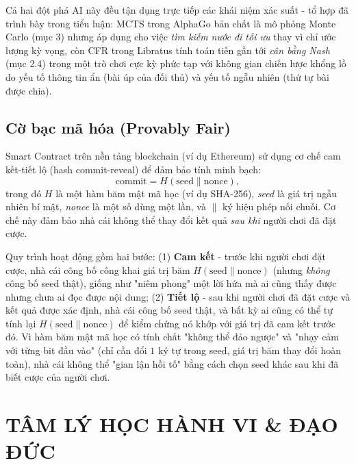\documentclass[12pt,a4paper]{article}
\theoremstyle{coloredthm}
\theoremstyle{coloreddef}
\theoremstyle{remark}
\begin{document}
\begin{giaithich}
Cả hai đột phá AI này đều tận dụng trực tiếp các khái niệm xác suất - tổ hợp đã trình bày trong tiểu luận: MCTS trong AlphaGo bản chất là mô phỏng Monte Carlo (mục 3) nhưng áp dụng cho việc \emph{tìm kiếm nước đi tối ưu} thay vì chỉ ước lượng kỳ vọng, còn CFR trong Libratus tính toán tiến gần tới \emph{cân bằng Nash} (mục 2.4) trong một trò chơi cực kỳ phức tạp với không gian chiến lược khổng lồ do yếu tố thông tin ẩn (bài úp của đối thủ) và yếu tố ngẫu nhiên (thứ tự bài được chia).
\end{giaithich}

\subsection{Cờ bạc mã hóa (Provably Fair)}

Smart Contract trên nền tảng blockchain (ví dụ Ethereum) sử dụng cơ chế cam kết-tiết lộ (hash commit-reveal) để đảm bảo tính minh bạch:
\[
\text{commit} = H(\text{seed} \| \text{nonce}),
\]
trong đó $H$ là một hàm băm mật mã học (ví dụ SHA-256), \emph{seed} là giá trị ngẫu nhiên bí mật, \emph{nonce} là một số dùng một lần, và $\|$ ký hiệu phép nối chuỗi. Cơ chế này đảm bảo nhà cái không thể thay đổi kết quả \emph{sau khi} người chơi đã đặt cược.

\begin{giaithich}
Quy trình hoạt động gồm hai bước: (1) \textbf{Cam kết} - trước khi người chơi đặt cược, nhà cái công bố công khai giá trị băm $H(\text{seed} \| \text{nonce})$ (nhưng \emph{không} công bố seed thật), giống như "niêm phong" một lời hứa mà ai cũng thấy được nhưng chưa ai đọc được nội dung; (2) \textbf{Tiết lộ} - sau khi người chơi đã đặt cược và kết quả được xác định, nhà cái công bố seed thật, và bất kỳ ai cũng có thể tự tính lại $H(\text{seed} \| \text{nonce})$ để kiểm chứng nó khớp với giá trị đã cam kết trước đó. Vì hàm băm mật mã học có tính chất "không thể đảo ngược" và "nhạy cảm với từng bit đầu vào" (chỉ cần đổi $1$ ký tự trong seed, giá trị băm thay đổi hoàn toàn), nhà cái không thể "gian lận hồi tố" bằng cách chọn seed khác sau khi đã biết cược của người chơi.
\end{giaithich}

\section{TÂM LÝ HỌC HÀNH VI \& ĐẠO ĐỨC}
\end{document}
